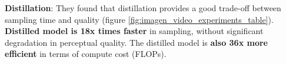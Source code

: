\textbf{Distillation}: They found that distillation provides a good trade-off between sampling time and quality (figure \ref{fig:imagen_video_experiments_table}). \textbf{Distilled model is 18x times faster} in sampling, without significant degradation in perceptual quality. The distilled model is \textbf{also 36x more efficient} in terms of compute cost (FLOPs). 